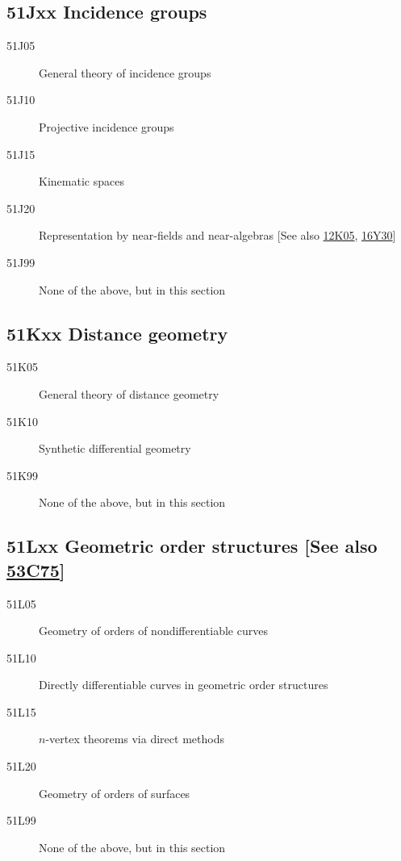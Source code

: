 \subsection*{51Jxx  Incidence groups }\label{51Jxx}
\begin{description}  
\item [51J05]\label{51J05} General theory of incidence groups
\item [51J10]\label{51J10} Projective incidence groups
\item [51J15]\label{51J15} Kinematic spaces
\item [51J20]\label{51J20} Representation by near-fields and near-algebras [See also \hyperref[12K05]{12K05}, \hyperref[16Y30]{16Y30}]
\item [51J99]\label{51J99} None of the above, but in this section
\end{description}
\subsection*{51Kxx  Distance geometry }\label{51Kxx}
\begin{description}  
\item [51K05]\label{51K05} General theory of distance geometry
\item [51K10]\label{51K10} Synthetic differential geometry
\item [51K99]\label{51K99} None of the above, but in this section
\end{description}
\subsection*{51Lxx  Geometric order structures [See also \hyperref[53C75]{53C75}] }\label{51Lxx}
\begin{description}  
\item [51L05]\label{51L05} Geometry of orders of nondifferentiable curves
\item [51L10]\label{51L10} Directly differentiable curves in geometric order structures
\item [51L15]\label{51L15} $n$-vertex theorems via direct methods
\item [51L20]\label{51L20} Geometry of orders of surfaces
\item [51L99]\label{51L99} None of the above, but in this section
\end{description}
